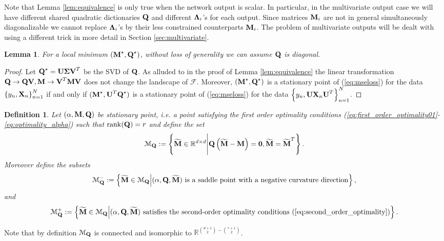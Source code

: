\documentclass[11pt]{article}
\theoremstyle{plain}
\newtheorem{lemma}{Lemma}
\newtheorem{definition}{Definition}
\DeclareMathOperator*{\rank}{rank}
\def\R{\mathbb{R}}
\theoremstyle{plain}
\numberwithin{equation}{section}
\numberwithin{lemma}{section}
\numberwithin{theorem}{section}
\numberwithin{corollary}{section}
\numberwithin{observation}{section}
\numberwithin{definition}{section}
\numberwithin{example}{section}
\begin{document}
Note that Lemma \ref{lem:equivalence} is only true when the network output is scalar. In particular, in the multivariate output case we will have different shared quadratic dictionaries $\Mx{Q}$ and different $\Mx{\Lambda}_i$'s for each output. Since matrices $\Mx{M}_i$ are not in general simultaneously diagonalizable we cannot replace $\Mx{\Lambda}_i$'s by their less constrained counterparts $\Mx{M}_i$. The problem of multivariate outputs will be dealt with using a different trick in more detail in Section \ref{sec:multivariate}.


\begin{lemma} \label{lem:Q_diag}
For a local minimum $(\Mx{M}^\star,\Mx{Q}^\star)$, without loss of generality we can assume $\Mx{Q}$ is diagonal.
\end{lemma}
\begin{proof}
Let $\Mx{Q}^\star=\Mx{U\Sigma V}^T$ be the SVD of $\Mx{Q}$. As alluded to in the proof of Lemma \ref{lem:equivalence} the linear transformation $\Mx{Q} \rightarrow \Mx{QV}, \Mx{M} \rightarrow \Mx{V}^T\Mx{MV}$ does not change the landscape of $\mathcal{F}$. Moreover, $(\Mx{M}^\star,\Mx{Q}^\star)$ is a stationary point of (\ref{eq:mseloss}) for the data $\left\{y_n,\Mx{X}_n\right\}_{n=1}^N$ if and only if $(\Mx{M}^\star,\Mx{U}^T\Mx{Q}^\star)$ is a stationary point of (\ref{eq:mseloss}) for the data $\left\{y_n,\Mx{UX}_n\Mx{U}^T\right\}_{n=1}^N$.
\end{proof}

\begin{definition}\label{def:SQ}
Let $(\alpha,\Mx{M},\Mx{Q})$ be stationary point, i.e. a point satisfying the first order optimality conditions (\ref{eq:first_order_optimality01}-\ref{eq:optimality_alpha}) such that $\rank(\Mx{Q}) = r$ and define the set
\[
\mathcal{M}_{\Mx{Q}} : = \left\{ \widetilde{\Mx{M}} \in \R^{d \times d} \Bigg|
\Mx{Q}\left(\Mx{\widetilde{M}}-\Mx{M}\right) = \Mx{0}, \widetilde{\Mx{M}} = \widetilde{\Mx{M}}^T\right\}.
\]
Moreover define the subsets
\[
\mathcal{M}^-_{\Mx{Q}} := \left\{ \widetilde{\Mx{M}} \in \mathcal{M}_{\Mx{Q}} \Big| (\alpha,\Mx{Q},\widetilde{\Mx{M}}) \text{ is a saddle point with a negative curvature direction} \right\},
\]
and
\[
\mathcal{M}^+_{\Mx{Q}} := \left\{ \widetilde{\Mx{M}} \in \mathcal{M}_{\Mx{Q}} \Big| (\alpha,\Mx{Q},\widetilde{\Mx{M}}) \text{ satisfies the second-order optimality conditions (\ref{eq:second_order_optimality}}) \right\}.
\]
\end{definition}


\noindent  Note that by definition $\mathcal{M}_{\Mx{Q}}$ is connected and isomorphic to $\R^{\binom{d+1}{2}-\binom{r+1}{2}}$.
\end{document}
